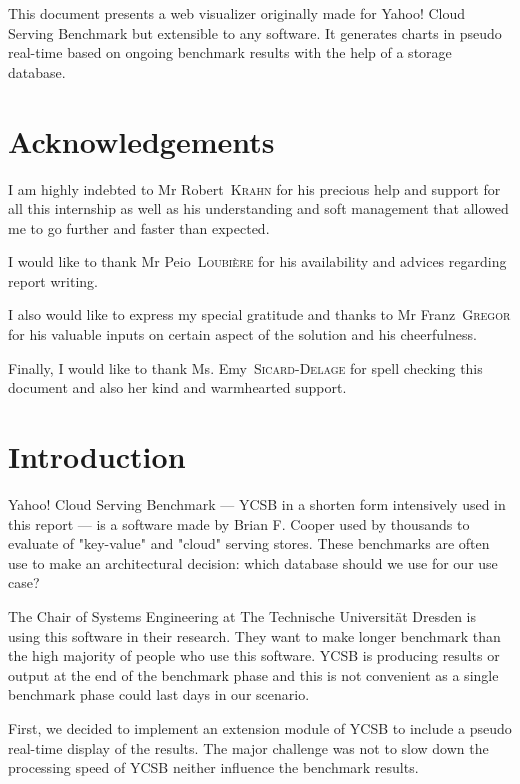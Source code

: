 \documentclass[a4paper,11pt]{report}
\newcommand*{\auteur}[2]{\large #1~\textsc{#2}} %
\begin{document}
This document presents a web visualizer originally made for Yahoo! Cloud Serving Benchmark but extensible to any software. It generates charts in pseudo real-time based on ongoing benchmark results with the help of a storage database.

\tableofcontents

\newpage

\listoffigures  %

\newpage
\chapter*{Acknowledgements}

I am highly indebted to Mr \auteur{Robert}{Krahn} for his precious help and support for all this internship as well as his understanding and soft management that allowed me to go further and faster than expected.

I would like to thank Mr \auteur{Peio}{Loubière} for his availability and advices regarding report writing.

I also would like to express my special gratitude and thanks to Mr \auteur{Franz}{Gregor} for his valuable inputs on certain aspect of the solution and his cheerfulness.

Finally, I would like to thank Ms. \auteur{Emy}{Sicard-Delage} for spell checking this document and also her kind and warmhearted support.

\chapter*{Introduction}

Yahoo! Cloud Serving Benchmark --- YCSB in a shorten form intensively used in this report --- is a software made by Brian F. Cooper \cite{ycsb:repo} used by thousands to evaluate of "key-value" and "cloud" serving stores. These benchmarks are often use to make an architectural decision: which database should we use for our use case?

The Chair of Systems Engineering at The Technische Universität Dresden is using this software in their research. They want to make longer benchmark than the high majority of people who use this software. YCSB is producing results or output at the end of the benchmark phase and this is not convenient as a single benchmark phase could last days in our scenario.

First, we decided to implement an extension module of YCSB to include a pseudo real-time display of the results. The major challenge was not to slow down the processing speed of YCSB neither influence the benchmark results. 
\end{document}
